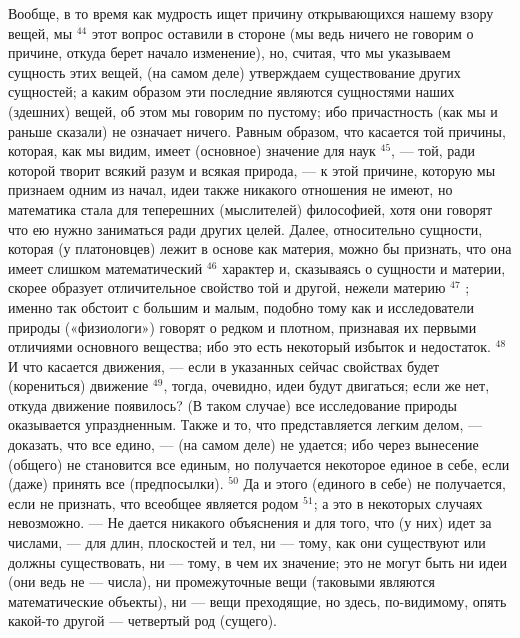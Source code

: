 \documentclass[oneside, 17pt, dvipsnames]{extbook}
\begin{document}
Вообще, в то время как мудрость ищет причину открывающихся нашему взору вещей, мы $^{44}$ этот вопрос оставили в стороне (мы ведь ничего не говорим о причине, откуда берет начало изменение), но, считая, что мы указываем сущность этих вещей, (на самом деле) утверждаем существование других сущностей; а каким образом эти последние являются сущностями наших (здешних) вещей, об этом мы говорим по пустому; ибо причастность (как мы и раньше сказали) не означает ничего. Равным образом, что касается той причины, которая, как мы видим, имеет (основное) значение для наук $^{45}$, — той, ради которой творит всякий разум и всякая природа, — к этой причине, которую мы признаем одним из начал, идеи также никакого отношения не имеют, но математика стала для теперешних (мыслителей) философией, хотя они говорят что ею нужно заниматься ради других целей. Далее, относительно сущности, которая (у платоновцев) лежит в основе как материя, можно бы признать, что она имеет слишком математический $^{46}$ характер и, сказываясь о сущности и материи, скорее образует отличительное свойство той и другой, нежели материю $^{47}$ ; именно так обстоит с большим и малым, подобно тому как и исследователи природы («физиологи») говорят о редком и плотном, признавая их первыми отличиями основного вещества; ибо это есть некоторый избыток и недостаток. $^{48}$ И что касается движения, — если в указанных сейчас свойствах будет (корениться) движение $^{49}$, тогда, очевидно, идеи будут двигаться; если же нет, откуда движение появилось? (В таком случае) все исследование природы оказывается упраздненным. Также и то, что представляется легким делом, — доказать, что все едино, — (на самом деле) не удается; ибо через вынесение (общего) не становится все единым, но получается некоторое единое в себе, если (даже) принять все (предпосылки). $^{50}$ Да и этого (единого в себе) не получается, если не признать, что всеобщее является родом $^{51}$; а это в некоторых случаях невозможно. — Не дается никакого объяснения и для того, что (у них) идет за числами, — для длин, плоскостей и тел, ни — тому, как они существуют или должны существовать, ни — тому, в чем их значение; это не могут быть ни идеи (они ведь не — числа), ни промежуточные вещи (таковыми являются математические объекты), ни — вещи преходящие, но здесь, по-видимому, опять какой-то другой — четвертый род (сущего).
\end{document}
